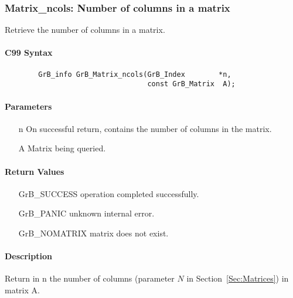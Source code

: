 \subsubsection{{\sf Matrix\_ncols}: Number of columns in a matrix}

Retrieve the number of columns in a matrix.

\paragraph{C99 Syntax}

\begin{verbatim}
        GrB_info GrB_Matrix_ncols(GrB_Index        *n,
                                  const GrB_Matrix  A);
\end{verbatim}

\paragraph{Parameters}

\begin{itemize}[leftmargin=1.1in]
    \item[{\sf n}] On successful return, contains the number of columns in the matrix.
    \item[{\sf A}] Matrix being queried.
\end{itemize}

\paragraph{Return Values}

\begin{itemize}[leftmargin=2.1in]
\item[{\sf GrB\_SUCCESS}]   operation completed successfully.
\item[{\sf GrB\_PANIC}]     unknown internal error.
\item[{\sf GrB\_NOMATRIX}]  matrix does not exist.
\end{itemize}

\paragraph{Description}

Return in {\sf n} the number of columns (parameter $N$ in Section~\ref{Sec:Matrices}) in matrix {\sf A}.

